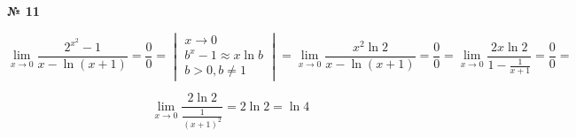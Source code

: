 \documentclass{article}
\begin{document}
\textbf{№ 11} 
\large

$$ \lim\limits_{x \to 0} \frac{2^{x^2} - 1}{x - \ln{(x+1)}}
= \frac{0}{0}
= \begin{vmatrix}
        x \to 0 \\
        b^x - 1 \approx x \ln{b} \\
        b>0, b \neq 1
   \end{vmatrix} 
= \lim\limits_{x \to 0} \frac{x^2\ln{2}}{x - \ln{(x+1)}} 
= \frac{0}{0}
= \lim\limits_{x \to 0} \frac{2x\ln{2}}{1 - \frac{1}{x+1}} 
= \frac{0}{0}
= $$  

$$ \lim\limits_{x \to 0} \frac{2\ln{2}}{\frac{1}{(x+1)^2}} 
= 2\ln{2}
= \ln{4} $$
\end{document}
